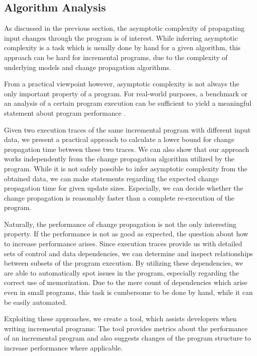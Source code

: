 \subsection{Algorithm Analysis}

As discussed in the previous section, the asymptotic complexity of propagating input changes through the program is of interest. While inferring asymptotic complexity is a task which is usually done by hand for a given algorithm, this approach can be hard for incremental programs, due to the complexity of underlying models and change propagation algorithms. 

From a practical viewpoint however, asymptotic complexity is not always the only important property of a program. For real-world purposes, a benchmark or an analysis of a certain program execution can be sufficient to yield a meaningful statement about program performance \cite{vokolos1998performance}.

Given two execution traces of the same incremental program with different input data, we present a practical approach to calculate a lower bound for change propagation time between these two traces. We can also show that our approach works independently from the change propagation algorithm utilized by the program. While it is not safely possible to infer asymptotic complexity from the obtained data, we can make statements regarding the expected change propagation time for given update sizes. Especially, we can decide whether the change propagation is reasonably faster than a complete re-execution of the program. 

Naturally, the performance of change propagation is not the only interesting property. If the performance is not as good as expected, the question about how to increase performance arises. Since execution traces provide us with detailed sets of control and data dependencies, we can determine and inspect relationships between subsets of the program execution. By utilizing these dependencies, we are able to automatically spot issues in the program, especially regarding the correct use of memorization. Due to the mere count of dependencies which arise even in small programs, this task is cumbersome to be done by hand, while it can be easily automated. 

Exploiting these approaches, we create a tool, which assists developers when writing incremental programs: The tool provides metrics about the performance of an incremental program and also suggests changes of the program structure to increase performance where applicable. 